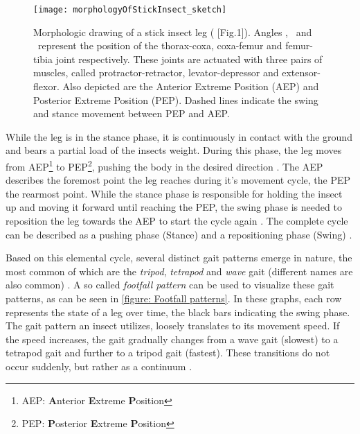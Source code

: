 \begin{figure}[h]
	\centerline{\texttt{[image: morphologyOfStickInsect\_sketch]}}
	\caption[Morphologic drawing of stick insect]{Morphologic drawing of a stick insect leg (\cite{schilling2013walknet} [Fig.1]).
		 	Angles \textalpha, \textbeta \ and \textgamma \ represent the position of the thorax-coxa, coxa-femur and femur-tibia joint respectively.
			These joints are actuated with three pairs of muscles, called protractor-retractor, levator-depressor and extensor-flexor.
			Also depicted are the Anterior Extreme Position (AEP) and Posterior Extreme Position (PEP).
			Dashed lines indicate the swing and stance movement between PEP and AEP.}
	\label{figure: Stick insect leg}
\end{figure}

While the leg is in the stance phase, it is continuously in contact with the ground and bears a partial load of the insects weight.
During this phase, the leg moves from AEP\footnote{AEP: \textbf{A}nterior \textbf{E}xtreme \textbf{P}osition} to PEP\footnote{\label{footnote: PEP}PEP: \textbf{P}osterior \textbf{E}xtreme \textbf{P}osition}, pushing the body in the desired direction \parencite{schilling2013walknet}.
The AEP describes the foremost point the leg reaches during it's movement cycle, the PEP the rearmost point.
While the stance phase is responsible for holding the insect up and moving it forward until reaching the PEP, the swing phase is needed to reposition the leg towards the AEP to start the cycle again \parencite{schilling2013walknet}.
The complete cycle can be described as a pushing phase (Stance) and a repositioning phase (Swing) .

Based on this elemental cycle, several distinct gait patterns emerge in nature, the most common of which are the \emph{tripod}, \emph{tetrapod} and \emph{wave} gait (different names are also common) \parencite{trotta2022walking,schilling2013walknet}.
A so called \textit{footfall pattern} can be used to visualize these gait patterns, as can be seen in \ref{figure: Footfall patterns}.
In these graphs, each row represents the state of a leg over time, the black bars indicating the swing phase.
The gait pattern an insect utilizes, loosely translates to its movement speed.
If the speed increases, the gait gradually changes from a wave gait (slowest) to a tetrapod gait and further to a tripod gait (fastest).
These transitions do not occur suddenly, but rather as a continuum \parencite{schilling2013walknet}.

